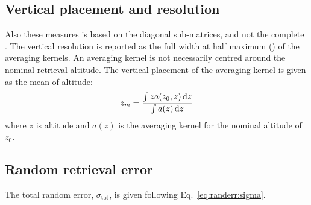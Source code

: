 \subsection{Vertical placement and resolution}
\label{sec:vertres}
%
Also these measures is based on the diagonal sub-matrices, and not the
complete \AvrKrnMtr. The vertical resolution is reported as the full width at
half maximum (\FWHM) of the averaging kernels. An averaging kernel is not
necessarily centred around the nominal retrieval altitude. The vertical
placement of the averaging kernel is given as the mean of altitude:
\begin{equation}
  \label{eq:zmean}
  z_m = \frac{\int z a(z_0,z)\, \mathrm{d} z}{\int a(z)\,\mathrm{d} z}
\end{equation}
where $z$ is altitude and $a(z)$ is the averaging kernel for the nominal
altitude of $z_0$.
\\


\subsection{Random retrieval error}
\label{sec:reterr}
%
The total random error, $\sigma_\mathrm{tot}$, is given following
Eq.~\ref{eq:randerr:sigma}.






